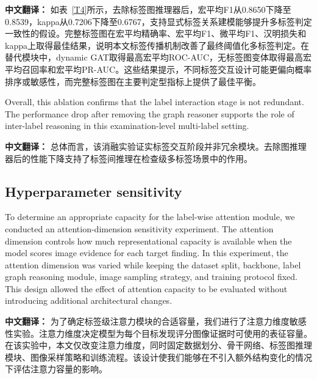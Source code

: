 \documentclass[Afour,sagev,times]{sagej}
\begin{document}
\textbf{中文翻译：} 如表~\ref{T4}所示，去除标签图推理器后，宏平均F1从0.8650下降至0.8539，kappa从0.7206下降至0.6767，支持显式标签关系建模能够提升多标签判定一致性的假设。完整标签图在宏平均精确率、宏平均F1、微平均F1、汉明损失和kappa上取得最佳结果，说明本文标签传播机制改善了最终阈值化多标签判定。在替代模块中，dynamic GAT取得最高宏平均ROC-AUC，无标签图变体取得最高宏平均召回率和宏平均PR-AUC。这些结果提示，不同标签交互设计可能更偏向概率排序或敏感性，而完整标签图在主要判定型指标上提供了最佳平衡。

Overall, this ablation confirms that the label interaction stage is not redundant. The performance drop after removing the graph reasoner supports the role of inter-label reasoning in this examination-level multi-label setting.

\textbf{中文翻译：} 总体而言，该消融实验证实标签交互阶段并非冗余模块。去除图推理器后的性能下降支持了标签间推理在检查级多标签场景中的作用。

\subsection{Hyperparameter sensitivity}
To determine an appropriate capacity for the label-wise attention module, we conducted an attention-dimension sensitivity experiment. The attention dimension controls how much representational capacity is available when the model scores image evidence for each target finding. In this experiment, the attention dimension was varied while keeping the dataset split, backbone, label graph reasoning module, image sampling strategy, and training protocol fixed. This design allowed the effect of attention capacity to be evaluated without introducing additional architectural changes.

\textbf{中文翻译：} 为了确定标签级注意力模块的合适容量，我们进行了注意力维度敏感性实验。注意力维度决定模型为每个目标发现评分图像证据时可使用的表征容量。在该实验中，本文仅改变注意力维度，同时固定数据划分、骨干网络、标签图推理模块、图像采样策略和训练流程。该设计使我们能够在不引入额外结构变化的情况下评估注意力容量的影响。
\end{document}
